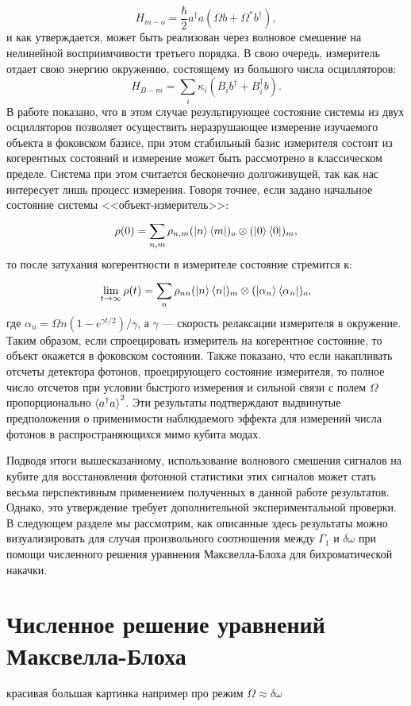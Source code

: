 \begin{equation}
	H_{m-o} = \frac{\hbar}{2}a^\dag a(\Omega b + \Omega^* b^\dag),
\end{equation}
и как утверждается, может быть реализован через волновое смешение на нелинейной восприимчивости третьего порядка. В свою очередь, измеритель отдает свою энергию окружению, состоящему из большого числа осцилляторов:
\begin{equation}
	H_{B-m} = \sum_i^{}\kappa_i\left(B_ib^\dag +B^\dag_i b\right).
\end{equation}
В работе \cite{WallsMilburn_PRD} показано, что в этом случае результирующее состояние системы из двух осцилляторов позволяет осуществить неразрушающее измерение изучаемого объекта в фоковском базисе, при этом стабильный базис измерителя состоит из когерентных состояний и измерение может быть рассмотрено в классическом пределе. Система при этом считается бесконечно долгоживущей, так как нас интересует лишь процесс измерения. Говоря точнее, если задано начальное состояние системы <<объект-измеритель>>:
\begin{equation}
	\rho(0) = \sum_{n,m}^{}\rho_{n,m}(\ket{n}\bra{m})_o\otimes(\ket{0}\bra{0})_m,
	\end{equation}
то после затухания когерентности в измерителе состояние стремится к:
\begin{equation}
	\lim_{t \to \infty}\rho(t) = \sum_n^{}\rho_{nn} (\ket{n}\bra{n})_m \otimes
	 (\ket{\alpha_n}\bra{\alpha_n})_o,
\end{equation}
где $\alpha_n = \Omega n (1-e^{\gamma t/2})/\gamma$, а $\gamma$ --- скорость релаксации измерителя в окружение. Таким образом, если спроецировать измеритель на когерентное состояние, то объект окажется в фоковском состоянии. Также показано, что если накапливать отсчеты детектора фотонов, проецирующего состояние измерителя, то полное число отсчетов при условии быстрого измерения и сильной связи с полем $\Omega$ пропорционально $\braket{a^\dag a}^2$. Эти результаты подтверждают выдвинутые предположения о применимости наблюдаемого эффекта для измерений числа фотонов в распространяющихся мимо кубита модах. 

Подводя итоги вышесказанному, использование волнового смешения сигналов на кубите для восстановления фотонной статистики этих сигналов может стать весьма перспективным применением полученных в данной работе результатов. Однако, это утверждение требует дополнительной экспериментальной проверки. В следующем разделе мы рассмотрим, как описанные здесь результаты можно визуализировать для случая произвольного соотношения между $\Gamma_1$ и $\delta\omega$ при помощи численного решения уравнения Максвелла-Блоха для бихроматической накачки.    

\section{Численное решение уравнений Максвелла-Блоха}
красивая большая картинка например про режим $\Omega \approx \delta \omega$
